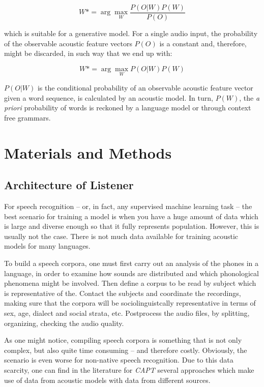 \documentclass[twocolumn]{bmcart}%
\begin{document}
\begin{equation}
W*= \arg\max_{W}\frac{P(O|W)P(W)}{P(O)}
\end{equation}

which is suitable for a generative model. For a single audio input, the probability of the observable acoustic feature vectors $P(O)$ is a constant and, therefore, might be discarded, in such way that we end up with:

\begin{equation}
W*= \arg\max_{W}P(O|W)P(W)
\end{equation}

$P(O|W)$ is the conditional probability of an observable acoustic feature vector given a word sequence, is calculated by an acoustic model. In turn, $P(W)$, the \emph{a priori} probability of words is reckoned by a language model or through context free grammars.

\section*{Materials and Methods}

\subsection*{\textbf{Architecture of Listener}}

For speech recognition -- or, in fact, any supervised  machine learning task -- the best
scenario for training a model is when you have a huge amount of data which is large and
diverse enough so that it fully represents population. However, this is usually not the case. 
There is not much data available for training acoustic models for many languages.

To build a speech corpora, one must first carry out an analysis of the phones in a language, in order to examine how sounds are distributed and which phonological phenomena might be involved. Then define a corpus to be read by subject which is representative of the. Contact the subjects and coordinate the recordings, making sure that the corpora will be sociolinguistcally representative in terms of sex, age, dialect and social strata, etc. Postprocess the audio files, by splitting, organizing, checking the audio quality.

As one might notice, compiling speech corpora is something that is not only complex, but also quite time consuming -- and therefore costly. Obviously, the scenario is even worse for non-native speech recognition.
Due to this data scarcity, one can find in the literature for \emph{CAPT} several approaches which make use of data from acoustic models with data from different sources.
\end{document}
